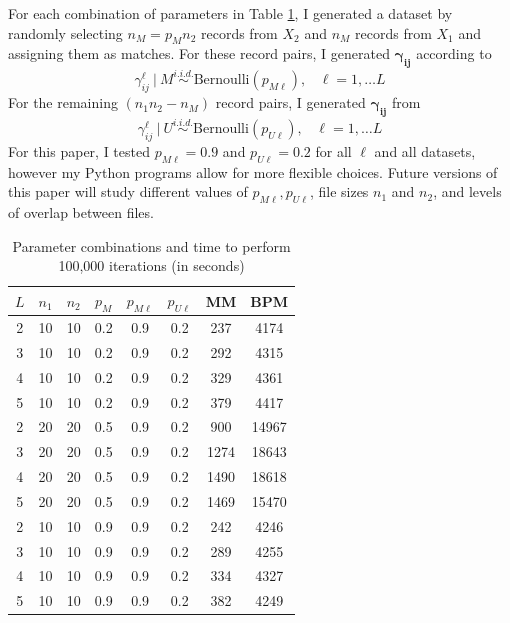 \documentclass[11pt,reqno]{amsart}
\newcommand\gamij{\mathbf{\gamma_{ij}}}
\begin{document}
For each combination of parameters in Table \ref{params}, I generated a dataset by randomly selecting $n_M = p_M n_2$ records from $X_2$ and $n_M$ records from $X_1$ and assigning them as matches.  For these record pairs, I generated $\gamij$ according to
 $$\gamma_{ij}^{\ell} \ | \ M \overset{i.i.d.}{\sim}\text{Bernoulli}(p_{M\ell}), \hspace{10pt}\ell = 1,\dots L$$ 
For the remaining $(n_1n_2 - n_M)$ record pairs, I generated $\gamij$ from
  $$\gamma_{ij}^{\ell} \ | \ U \overset{i.i.d.}{\sim}\text{Bernoulli}(p_{U\ell}), \hspace{10pt}\ell = 1,\dots L$$ 
For this paper, I tested $p_{M\ell} = 0.9$ and $p_{U\ell}=0.2$ for all $\ell$ and all datasets, however my Python programs allow for more flexible choices.  Future versions of this paper will study different values of $p_{M\ell}, p_{U\ell}$, file sizes $n_1$ and $n_2$, and levels of overlap between files. 

\begin{table}[h!]
\caption{Parameter combinations and time to perform 100,000 iterations (in seconds)}
\begin{center}
\begin{tabular}{cccccc|cc}
\toprule
 $L$ &  $n_1$ &  $n_2$ &  $p_M$ &  $p_{M\ell}$ &  $p_{U\ell}$ & MM & BPM \\
\midrule
 2 &  10 &  10 &  0.2 &  0.9 &  0.2 & 237 & 4174 \\
 3 &  10 &  10 &  0.2 &  0.9 &  0.2 & 292 & 4315 \\
 4 &  10 &  10 &  0.2 &  0.9 &  0.2 & 329 & 4361 \\ 
 5 &  10 &  10 &  0.2 &  0.9 &  0.2 & 379 & 4417 \\ 
 2 &  20 &  20 &  0.5 &  0.9 &  0.2 &  900 & 14967 \\ 
 3 &  20 &  20 &  0.5 &  0.9 &  0.2 & 1274 & 18643 \\ 
 4 &  20 &  20 &  0.5 &  0.9 &  0.2 & 1490 & 18618\\
 5 &  20 &  20 &  0.5 &  0.9 &  0.2 & 1469 & 15470 \\
 2 &  10 &  10 &  0.9 &  0.9 &  0.2 &  242 & 4246 \\
 3 &  10 &  10 &  0.9 &  0.9 &  0.2 & 289 & 4255 \\
 4 &  10 &  10 &  0.9 &  0.9 &  0.2 & 334 & 4327 \\
 5 &  10 &  10 &  0.9 &  0.9 &  0.2 & 382 & 4249 \\
\bottomrule
\end{tabular}
\end{center}
\label{params}
\end{table}%
\end{document}

